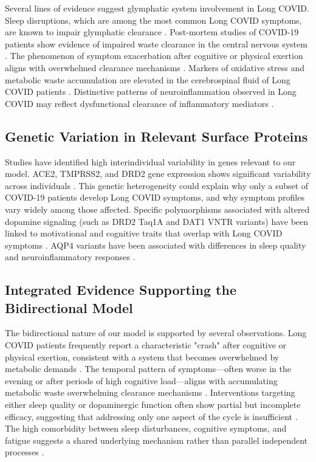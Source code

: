 \documentclass[12pt]{article}
\begin{document}
Several lines of evidence suggest glymphatic system involvement in Long COVID. Sleep disruptions, which are among the most common Long COVID symptoms, are known to impair glymphatic clearance \citep{Xie2013}. Post-mortem studies of COVID-19 patients show evidence of impaired waste clearance in the central nervous system \citep{Thakur2021}. The phenomenon of symptom exacerbation after cognitive or physical exertion aligns with overwhelmed clearance mechanisms \citep{Pimentel2022}. Markers of oxidative stress and metabolic waste accumulation are elevated in the cerebrospinal fluid of Long COVID patients \citep{Frontera2022}. Distinctive patterns of neuroinflammation observed in Long COVID may reflect dysfunctional clearance of inflammatory mediators \citep{Fernandez-Castaneda2022}.

\subsection*{Genetic Variation in Relevant Surface Proteins}

Studies have identified high interindividual variability in genes relevant to our model. ACE2, TMPRSS2, and DRD2 gene expression shows significant variability across individuals \citep{cao2020ace2genetics, hou2021ace2variants, eisenstein2016drd2}. This genetic heterogeneity could explain why only a subset of COVID-19 patients develop Long COVID symptoms, and why symptom profiles vary widely among those affected. Specific polymorphisms associated with altered dopamine signaling (such as DRD2 Taq1A and DAT1 VNTR variants) have been linked to motivational and cognitive traits that overlap with Long COVID symptoms \citep{gizer2009adhdgenes}. AQP4 variants have been associated with differences in sleep quality and neuroinflammatory responses \citep{boespflug2018}.

\subsection*{Integrated Evidence Supporting the Bidirectional Model}

The bidirectional nature of our model is supported by several observations. Long COVID patients frequently report a characteristic "crash" after cognitive or physical exertion, consistent with a system that becomes overwhelmed by metabolic demands \citep{davis2021longcovidcohort}. The temporal pattern of symptoms—often worse in the evening or after periods of high cognitive load—aligns with accumulating metabolic waste overwhelming clearance mechanisms \citep{graham2021longcovidneuro}. Interventions targeting either sleep quality or dopaminergic function often show partial but incomplete efficacy, suggesting that addressing only one aspect of the cycle is insufficient \citep{beauchamp2022parkinsonismwave}. The high comorbidity between sleep disturbances, cognitive symptoms, and fatigue suggests a shared underlying mechanism rather than parallel independent processes \citep{davis2021longcovidcohort}.
\end{document}
